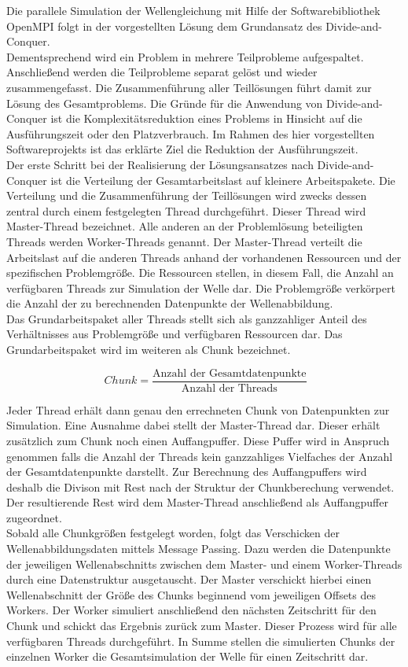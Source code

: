 Die parallele Simulation der Wellengleichung mit Hilfe der Softwarebibliothek OpenMPI folgt in der vorgestellten Lösung dem Grundansatz des Divide-and-Conquer.\\
Dementsprechend wird ein Problem in mehrere Teilprobleme aufgespaltet. Anschließend werden die Teilprobleme separat gelöst und wieder zusammengefasst. Die Zusammenführung aller Teillösungen führt damit zur Lösung des Gesamtproblems. Die Gründe für die Anwendung von Divide-and-Conquer ist die Komplexitätsreduktion eines Problems in Hinsicht auf die Ausführungszeit oder den Platzverbrauch. Im Rahmen des hier vorgestellten Softwareprojekts ist das erklärte Ziel die Reduktion der Ausführungszeit.\\
Der erste Schritt bei der Realisierung der Lösungsansatzes nach Divide-and-Conquer ist die Verteilung der Gesamtarbeitslast auf kleinere Arbeitspakete. Die Verteilung und die Zusammenführung der Teillösungen wird zwecks dessen zentral durch einem festgelegten Thread durchgeführt. Dieser Thread wird Master-Thread bezeichnet. Alle anderen an der Problemlösung beteiligten Threads werden Worker-Threads genannt. Der Master-Thread verteilt die Arbeitslast auf die anderen Threads anhand der vorhandenen Ressourcen und der spezifischen Problemgröße. Die Ressourcen stellen, in diesem Fall, die Anzahl an verfügbaren Threads zur Simulation der Welle dar. Die Problemgröße verkörpert die Anzahl der zu berechnenden Datenpunkte der Wellenabbildung.\\
Das Grundarbeitspaket aller Threads stellt sich als ganzzahliger Anteil des Verhältnisses aus Problemgröße und verfügbaren Ressourcen dar. Das Grundarbeitspaket wird im weiteren als Chunk bezeichnet.

\begin{equation}
\ Chunk = \frac{\text{Anzahl der Gesamtdatenpunkte}}{\text{Anzahl der Threads}}
\end{equation}

Jeder Thread erhält dann genau den errechneten Chunk von Datenpunkten zur Simulation. Eine Ausnahme dabei stellt der Master-Thread dar. Dieser erhält zusätzlich zum Chunk noch einen Auffangpuffer. Diese Puffer wird in Anspruch genommen falls die Anzahl der Threads kein ganzzahliges Vielfaches der Anzahl der Gesamtdatenpunkte darstellt. Zur Berechnung des Auffangpuffers wird deshalb die Divison mit Rest nach der Struktur der Chunkberechung verwendet. Der resultierende Rest wird dem Master-Thread anschließend als Auffangpuffer zugeordnet.\\
Sobald alle Chunkgrößen festgelegt worden, folgt das Verschicken der Wellenabbildungsdaten mittels Message Passing. Dazu werden die Datenpunkte der jeweiligen Wellenabschnitts zwischen dem Master- und einem Worker-Threads durch eine Datenstruktur ausgetauscht. Der Master verschickt hierbei einen Wellenabschnitt der Größe des Chunks beginnend vom jeweiligen Offsets des Workers. Der Worker simuliert anschließend den nächsten Zeitschritt für den Chunk und schickt das Ergebnis zurück zum Master. Dieser Prozess wird für alle verfügbaren Threads durchgeführt. In Summe stellen die simulierten Chunks der einzelnen Worker die Gesamtsimulation der Welle für einen Zeitschritt dar.\\

